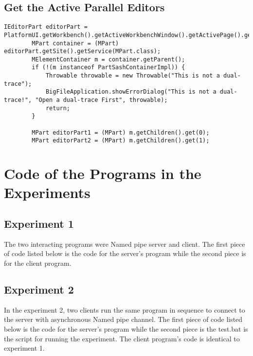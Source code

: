\begin{appendices}
\section{Get the Active Parallel Editors}
\begin{lstlisting}[caption= code for getting parallel editors ]
IEditorPart editorPart = PlatformUI.getWorkbench().getActiveWorkbenchWindow().getActivePage().getActiveEditor();
		MPart container = (MPart) editorPart.getSite().getService(MPart.class);
		MElementContainer m = container.getParent();
		if (!(m instanceof PartSashContainerImpl)) {
			Throwable throwable = new Throwable("This is not a dual-trace");
			BigFileApplication.showErrorDialog("This is not a dual-trace!", "Open a dual-trace First", throwable);
			return;
		}

		MPart editorPart1 = (MPart) m.getChildren().get(0);
		MPart editorPart2 = (MPart) m.getChildren().get(1);
\end{lstlisting}

\chapter{Code of the Programs in the Experiments}\label{expcode}
\section{Experiment 1}
The two interacting programs were Named pipe server and client. The first piece of code listed below is the code for the server's program while the second piece is for the client program.



\section{Experiment 2}
In the experiment 2, two clients run the same program in sequence to connect to the server with asynchronous Named pipe channel. The first piece of code listed below is the code for the server's program while the second piece is the test.bat is the script for running the experiment. The client  program's code is identical to experiment 1.



\end{appendices}